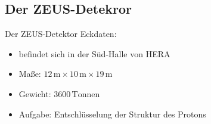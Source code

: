 \documentclass[aspectratio=1610, 9pt]{beamer}
\begin{document}
\subsection{Der ZEUS-Detekror}
\begin{frame}{Der ZEUS-Detektor}
Eckdaten:
  \begin{itemize}
    \item{befindet sich in der Süd-Halle von HERA}
    \item{Maße: $12 \,\mathrm{m} \times 10 \,\mathrm{m} \times 19 \,\mathrm{m}  $  }
    \item{Gewicht: $3600 \,\mathrm{Tonnen}$ }
    \item{Aufgabe: Entschlüsselung der Struktur des Protons}
  \end{itemize}
\end{frame}
\end{document}
